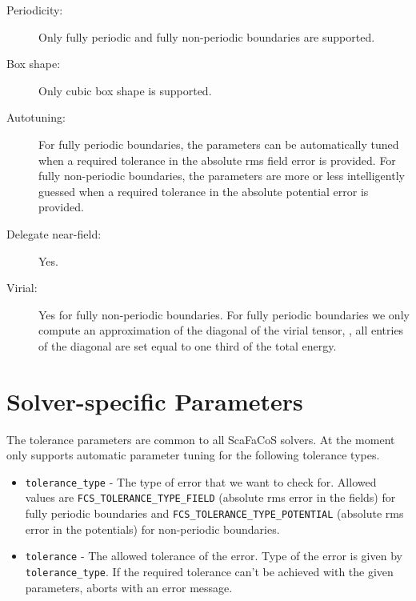 \begin{description}
\item[Periodicity:] Only fully periodic and fully non-periodic boundaries are supported.
\item[Box shape:] Only cubic box shape is supported.
\item[Autotuning:] For fully periodic boundaries, the parameters can be automatically tuned when a
  required tolerance in the absolute rms field error is provided. For fully non-periodic boundaries,
  the parameters are more or less intelligently guessed when a required tolerance in the absolute
  potential error is provided.  
\item[Delegate near-field:] Yes.
\item[Virial:] Yes for fully non-periodic boundaries. For fully periodic boundaries we only compute an approximation of
  the diagonal of the virial tensor, \ie, all entries of the diagonal are set equal to one third of the total energy.
\end{description}

\section{Solver-specific Parameters}
The tolerance parameters are common to all ScaFaCoS solvers. At the moment \ptwonfft only supports automatic parameter tuning for the following tolerance types.
\begin{itemize}
  \item \verb!tolerance_type! -
    The type of error that we want to check for. Allowed values are \verb!FCS_TOLERANCE_TYPE_FIELD! (absolute rms error in the fields)
    for fully periodic boundaries and \verb!FCS_TOLERANCE_TYPE_POTENTIAL! (absolute rms error in the potentials) for non-periodic boundaries.
  \item \verb!tolerance! -
    The allowed tolerance of the error. Type of the error is given by \verb!tolerance_type!. If the required tolerance can't be achieved
    with the given parameters, \ptwonfft aborts with an error message.
\end{itemize}

